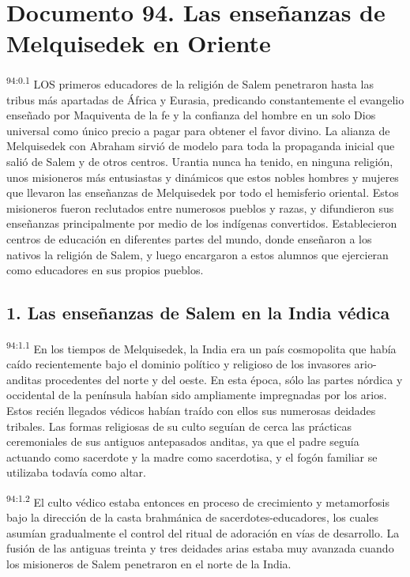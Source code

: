 \chapter{Documento 94. Las enseñanzas de Melquisedek en Oriente}
\par
\textsuperscript{94:0.1} LOS primeros educadores de la religión de Salem penetraron hasta las tribus más apartadas de África y Eurasia, predicando constantemente el evangelio enseñado por Maquiventa de la fe y la confianza del hombre en un solo Dios universal como único precio a pagar para obtener el favor divino. La alianza de Melquisedek con Abraham sirvió de modelo para toda la propaganda inicial que salió de Salem y de otros centros. Urantia nunca ha tenido, en ninguna religión, unos misioneros más entusiastas y dinámicos que estos nobles hombres y mujeres que llevaron las enseñanzas de Melquisedek por todo el hemisferio oriental. Estos misioneros fueron reclutados entre numerosos pueblos y razas, y difundieron sus enseñanzas principalmente por medio de los indígenas convertidos. Establecieron centros de educación en diferentes partes del mundo, donde enseñaron a los nativos la religión de Salem, y luego encargaron a estos alumnos que ejercieran como educadores en sus propios pueblos.

\section*{1. Las enseñanzas de Salem en la India védica}
\par
\textsuperscript{94:1.1} En los tiempos de Melquisedek, la India era un país cosmopolita que había caído recientemente bajo el dominio político y religioso de los invasores ario-anditas procedentes del norte y del oeste. En esta época, sólo las partes nórdica y occidental de la península habían sido ampliamente impregnadas por los arios. Estos recién llegados védicos habían traído con ellos sus numerosas deidades tribales. Las formas religiosas de su culto seguían de cerca las prácticas ceremoniales de sus antiguos antepasados anditas, ya que el padre seguía actuando como sacerdote y la madre como sacerdotisa, y el fogón familiar se utilizaba todavía como altar.

\par
\textsuperscript{94:1.2} El culto védico estaba entonces en proceso de crecimiento y metamorfosis bajo la dirección de la casta brahmánica de sacerdotes-educadores, los cuales asumían gradualmente el control del ritual de adoración en vías de desarrollo. La fusión de las antiguas treinta y tres deidades arias estaba muy avanzada cuando los misioneros de Salem penetraron en el norte de la India.

